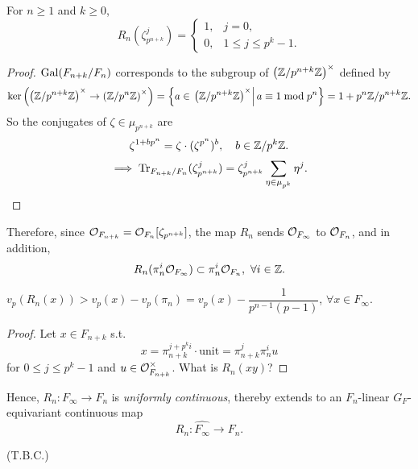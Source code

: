 \begin{lemma}
    For $n\ge 1$ and $k\ge 0$,
    \[R_n(\zeta_{p^{n+k}}^j) = \begin{cases}
        1, & j  = 0,\\ 0, &1\le j\le p^{k}-1.
    \end{cases}\]
\end{lemma}
\begin{proof}
    $\operatorname{Gal}(F_{n+k}/F_n)$ corresponds to the subgroup of $\left( \mathbb{Z}/p^{n+k}\mathbb{Z} \right)^\times$ defined by \[\ker\left( \left( \mathbb{Z}/p^{n+k}\mathbb{Z} \right)^\times\to \left( \mathbb{Z}/p^{n}\mathbb{Z} \right)^\times \right)
    = \left\{a\in \left.\left( \mathbb{Z}/p^{n+k}\mathbb{Z} \right)^\times\right|a\equiv 1\bmod p^n \right\} = 1 + p^n\mathbb{Z}/p^{n+k}\mathbb{Z}.\]
    So the conjugates of $\zeta\in\mu_{p^{n+k}}$ are
    \[\zeta^{1 + bp^n} = \zeta\cdot(\zeta^{p^n})^b, \quad b\in \mathbb{Z}/p^{k}\mathbb{Z}.\]
\[\implies \operatorname{Tr}_{F_{n+k}/F_n}(\zeta_{p^{n+k}}^j) = \zeta_{p^{n+k}}^j\sum_{\eta\in\mu_{p^k}}\eta^j.
\qedhere
\]
\end{proof}
Therefore, since $\mathcal{O}_{F_{n+k}} = \mathcal{O}_{F_n}[\zeta_{p^{n+k}}]$, the map $R_n$ sends $\mathcal{O}_{F_\infty}$ to $\mathcal{O}_{F_n}$,
and in addition, \[R_n(\pi_n^i\mathcal{O}_{F_\infty}) \subset \pi_n^i\mathcal{O}_{F_n},\ \forall i\in\mathbb{Z}.\]
\begin{corollary}
    $v_p(R_n(x)) > v_p(x) - v_p(\pi_n) =v_p(x) - \dfrac{1}{p^{n-1}(p-1)}$, $\forall x\in F_\infty$.
\end{corollary}
\begin{proof}
    Let $x\in F_{n+k}$ s.t. \[x = \pi_{n + k}^{j + p^ki}\cdot\text{unit}  = \pi_{n+k}^j\pi_{n}^iu\] for
    $0\le j\le p^{k}-1$ and $u\in \mathcal{O}_{F_{n+k}}^\times$.
    What is $R_n(xy)$?
\end{proof}

Hence, $R_n : F_\infty\to F_n$ is \textit{uniformly continuous},
thereby extends to an $F_n$-linear $G_F$-equivariant continuous map
\[R_n : \widehat{F_\infty}\to F_n.\]

(T.B.C.)

